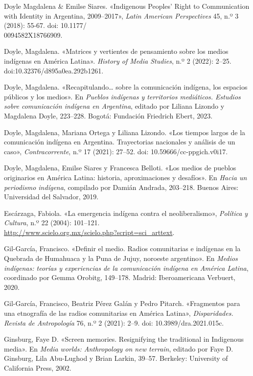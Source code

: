 \documentclass{tufte-handout}
\begin{document}
\begin{hangparas}{.25in}{1}
Doyle Magdalena \& Emilse Siares. «Indigenous Peoples' Right to
Communication with Identity in Argentina, 2009--2017», \emph{Latin
American Perspectives} 45, n.º 3 (2018): 55-67.
doi: 10.1177/\\\hspace{.267in}0094582X18766909.

Doyle, Magdalena. «Matrices y vertientes de pensamiento sobre los medios
indígenas en América Latina». \emph{History of Media Studies}, n.º 2
(2022): 2--25. doi:10.32376/d895a0ea.292b1261.

Doyle, Magdalena. «Recapitulando\ldots{} sobre la comunicación indígena,
los espacios públicos y los medios». En \emph{Pueblos indígenas y
territorios mediáticos. Estudios sobre comunicación indígena en
Argentina}, editado por Liliana Lizondo y Magdalena Doyle, 223--228.
Bogotá: Fundación Friedrich Ebert, 2023.

Doyle, Magdalena, Mariana Ortega y Liliana Lizondo. «Los tiempos largos
de la comunicación indígena en Argentina. Trayectorias nacionales y
análisis de un caso», \emph{Contracorrente}, n.º 17 (2021): 27--52. doi:
10.59666/cc-ppgich.v0i17.

Doyle, Magdalena, Emilse Siares y Francesca Belloti. «Los medios de
pueblos originarios en América Latina: historia, aproximaciones y
desafíos». En \emph{Hacia un periodismo indígena}, compilado por Damián
Andrada, 203--218. Buenos Aires: Universidad del Salvador, 2019.

Escárzaga, Fabiola. «La emergencia indígena contra el neoliberalismo»,
\emph{Política y Cultura}, n.º 22 (2004): 101--121.
\\\hspace{.267in}\href{http://www.scielo.org.mx/scielo.php?script=sci_arttext\&pid=S0188-77422004000200006}{http://www.scielo.org.mx/scielo.php?script=sci_arttext}.

Gil-García, Francisco. «Definir el medio. Radios comunitarias e
indígenas en la Quebrada de Humahuaca y la Puna de Jujuy, noroeste
argentino». En \emph{Medios indígenas: teorías y experiencias de la
comunicación indígena en América Latina}, coordinado por Gemma Orobitg,
149--178. Madrid: Iberoamericana Verbuert, 2020.

Gil-García, Francisco, Beatriz Pérez Galán y Pedro Pitarch. «Fragmentos
para una etnografía de las radios comunitarias en América Latina»,
\emph{Disparidades. Revista de Antropología} 76, n.º 2 (2021): 2--9.
doi: 10.3989/dra.2021.015c.

Ginsburg, Faye D. «Screen memories. Resignifying the traditional in
Indigenous media». En \emph{Media worlds: Anthropology on new terrain},
editado por Faye D. Ginsburg, Lila Abu-Lughod y Brian Larkin, 39--57.
Berkeley: University of California Press, 2002.


\end{hangparas}
\end{document}
